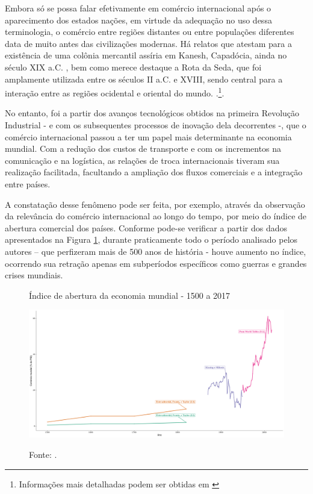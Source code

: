 \documentclass[12pt,
               openright,
               oneside,
               a4paper,
							 section=TITLE,     %
               subsection=Title,  %
               english,brazil]{article}
\begin{document}
Embora só se possa falar efetivamente em comércio internacional após o aparecimento dos estados nações, em virtude da adequação no uso dessa terminologia, o comércio entre regiões distantes ou entre populações diferentes data de muito antes das civilizações modernas. Há relatos que atestam para a existência de uma colônia mercantil assíria em Kanesh, Capadócia, ainda no século XIX a.C. \cite{Stearns2001}, bem como merece destaque a Rota da Seda, que foi amplamente utilizada entre os séculos II a.C. e XVIII, sendo central para a interação entre as regiões ocidental e oriental do mundo. \cite{Elisseeff2000}.\footnote{Informações mais detalhadas podem ser obtidas em \cite{Junguito2016, Vanham2019}}.

No entanto, foi a partir dos avanços tecnológicos obtidos na primeira Revolução Industrial - e com os subsequentes processos de inovação dela decorrentes -, que o comércio internacional passou a ter um papel mais determinante na economia mundial. Com a redução dos custos de transporte e com os incrementos na comunicação e na logística, as relações de troca internacionais tiveram sua realização facilitada, facultando a ampliação dos fluxos comerciais e a integração entre países. 

A constatação desse fenômeno pode ser feita, por exemplo, através da observação da relevância do comércio internacional ao longo do tempo, por meio do índice de abertura comercial dos países. Conforme pode-se verificar a partir dos dados apresentados na Figura \ref{fig:1}, durante praticamente todo o período analisado pelos autores – que perfizeram mais de 500 anos de história - houve aumento no índice, ocorrendo sua retração apenas em subperíodos específicos como guerras e grandes crises mundiais.

\begin{figure}[H]
	\centering
		\caption{Índice de abertura da economia mundial - 1500 a 2017 }
		{}%
        \includegraphics[width=\linewidth]{Figuras/globalizacao.png}
	\label{fig:1}
	\caption*{\RaggedRight  Fonte: \cite{Estevadeordal2003, Feenstra2015, Klasing2014}.}
\end{figure}
\end{document}
